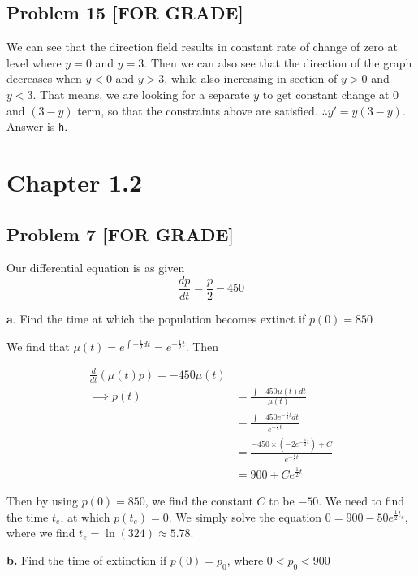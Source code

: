 \documentclass[12pt]{article}
\begin{document}
\subsection*{Problem 15 [FOR GRADE]}
\label{sec:orgd5ed1ad}
We can see that the direction field results in constant rate of change of
zero at level where \(y=0\) and \(y=3\). Then we can also see that the direction
of the graph decreases when \(y<0\) and \(y>3\), while also increasing in section
of \(y>0\) and \(y<3\). That means, we are looking for a separate \(y\) to get
constant change at \(0\) and \((3-y)\) term, so that the constraints above are
satisfied. \(\therefore y' = y(3-y)\). Answer is \texttt{h}.
\section*{Chapter 1.2}
\label{sec:orga6fb566}
\subsection*{Problem 7 [FOR GRADE]}
\label{sec:org11544b4}
Our differential equation is as given
\begin{equation*}
        \frac{dp}{dt} = \frac{p}{2} - 450
\end{equation*}

\textbf{a}. Find the time at which the population becomes extinct if \(p(0)=850\)

We find that \(\mu(t) = e^{\int -\frac{1}{2} dt} = e^{-\frac{1}{2}t}\). Then

\begin{align*}
        \frac{d}{dt}(\mu(t)p) = -450 \mu(t)                                                 \\
        \implies p(t) & = \frac{\int -450\mu(t) dt}{\mu(t)}                                 \\
                      & = \frac{\int -450 e^{-\frac{1}{2}t}dt}{e^{-\frac{1}{2}t}}         \\
                      & = \frac{-450 \times (-2e^{-\frac{1}{2}t}) + C}{e^{-\frac{1}{2}t}} \\
                      & = 900 + C e^{\frac{1}{2}t}
\end{align*}

Then by using \(p(0)=850\), we find the constant \(C\) to be \(-50\). We need to
find the time \(t_e\), at which \(p(t_e)=0\). We simply solve the equation
\(0 = 900 - 50 e^{\frac{1}{2}t_e}\), where we find \(t_e = \ln(324) \approx 5.78\). 

\textbf{b.} Find the time of extinction if \(p(0)=p_0\), where \(0<p_0<900\)
\end{document}
